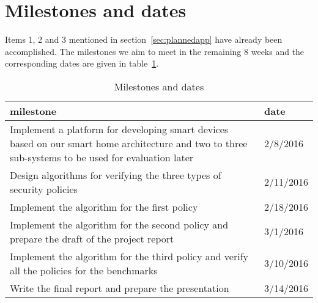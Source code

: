 \documentclass{article}
\begin{document}
\section{Milestones and dates}
Items 1, 2 and 3 mentioned in section~\ref{sec:plannedapp} have already been accomplished. 
The milestones we aim to meet in the remaining 8 weeks and the corresponding dates are given in table~\ref{table:milestone}.
\begin{table}
\begin{center}
\begin{tabular}{|p{5cm}|p{2cm}|}
\hline 
milestone & date \\ \hline
Implement a platform for developing smart devices based on our smart home architecture and  two to three sub-systems to be used for evaluation later & 2/8/2016 \\\hline
Design algorithms for verifying the three types of security policies & 2/11/2016 \\\hline
Implement the algorithm for the first policy & 2/18/2016 \\\hline
Implement the algorithm for the second policy and prepare the draft of the project report & 3/1/2016  \\\hline
Implement the algorithm for the third policy and verify all the policies for the benchmarks & 3/10/2016 \\\hline
Write the final report and prepare the presentation & 3/14/2016 \\\hline
\end{tabular}
\end{center}
\caption{Milestones and dates}
\label{table:milestone}
\end{table}




\end{document}
